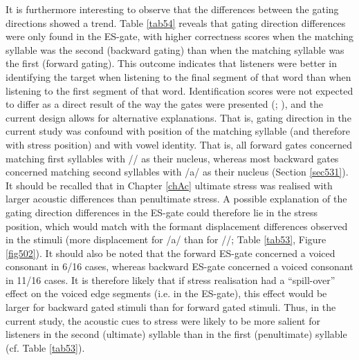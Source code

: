 It is furthermore interesting to observe that the differences between the gating directions showed a trend. Table \ref{tab54} reveals that gating direction differences were only found in the ES-gate, with higher correctness scores when the matching syllable was the second (backward gating) than when the matching syllable was the first (forward gating). This outcome indicates that listeners were better in identifying the target when listening to the final segment of that word than when listening to the first segment of that word. Identification scores were not expected to differ as a direct result of the way the gates were presented (\citealt{salasoo_interaction_1985}; \citealt{wingfield_word_1997}), and the current design allows for alternative explanations. That is, gating direction in the current study was confound with position of the matching syllable (and therefore with stress position) and with vowel identity. That is, all forward gates concerned matching first syllables with // as their nucleus, whereas most backward gates concerned matching second syllables with /a/ as their nucleus (Section \ref{sec531}). It should be recalled that in Chapter \ref{chAc} ultimate stress was realised with larger acoustic differences than penultimate stress. A possible explanation of the gating direction differences in the ES-gate could therefore lie in the stress position, which would match with the formant displacement differences observed in the stimuli (more displacement for /a/ than for //; Table \ref{tab53}, Figure \ref{fig502}). It should also be noted that the forward ES-gate concerned a voiced consonant in 6/16 cases, whereas backward ES-gate concerned a voiced consonant in 11/16 cases. It is therefore likely that if stress realisation had a ``spill-over'' effect on the voiced edge segments (i.e. in the ES-gate), this effect would be larger for backward gated stimuli than for forward gated stimuli. Thus, in the current study, the acoustic cues to stress were likely to be more salient for listeners in the second (ultimate) syllable than in the first (penultimate) syllable (cf. Table \ref{tab53}).\par

